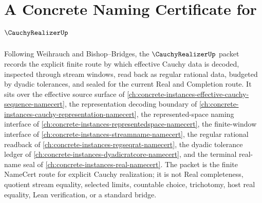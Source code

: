 \chapter{A Concrete Naming Certificate for $\CauchyRealizerUp$}
\label{ch:concrete-instances-cauchy-realizer-namecert}

Following Weihrauch and Bishop--Bridges, the $\CauchyRealizerUp$ packet records the explicit finite route by which effective Cauchy data is decoded, inspected through stream windows, read back as regular rational data, budgeted by dyadic tolerances, and sealed for the current Real and Completion route. It sits over the effective source surface of \autoref{ch:concrete-instances-effective-cauchy-sequence-namecert}, the representation decoding boundary of \autoref{ch:concrete-instances-cauchy-representation-namecert}, the represented-space naming interface of \autoref{ch:concrete-instances-representedspace-namecert}, the finite-window interface of \autoref{ch:concrete-instances-streamname-namecert}, the regular rational readback of \autoref{ch:concrete-instances-regseqrat-namecert}, the dyadic tolerance ledger of \autoref{ch:concrete-instances-dyadicratcore-namecert}, and the terminal real-name seal of \autoref{ch:concrete-instances-real-namecert}. The packet is the finite NameCert route for explicit Cauchy realization; it is not Real completeness, quotient stream equality, selected limits, countable choice, trichotomy, host real equality, Lean verification, or a standard bridge.

